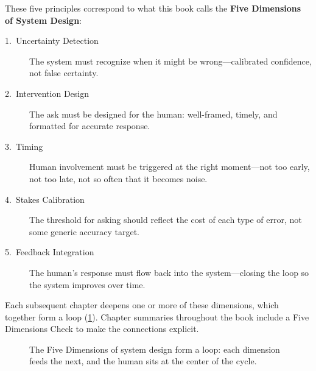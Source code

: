 These five principles correspond to what this book calls the \textbf{Five Dimensions of \hitl System Design}:

\begin{keyconcept}
\begin{description}
  \item[1.\ Uncertainty Detection] The system must recognize when it might be wrong---calibrated confidence, not false certainty.
  \item[2.\ Intervention Design] The ask must be designed for the human: well-framed, timely, and formatted for accurate response.
  \item[3.\ Timing] Human involvement must be triggered at the right moment---not too early, not too late, not so often that it becomes noise.
  \item[4.\ Stakes Calibration] The threshold for asking should reflect the cost of each type of error, not some generic accuracy target.
  \item[5.\ Feedback Integration] The human's response must flow back into the system---closing the loop so the system improves over time.
\end{description}
Each subsequent chapter deepens one or more of these dimensions, which together form a loop (\cref{fig:five-dimensions}). Chapter summaries throughout the book include a Five Dimensions Check to make the connections explicit.
\end{keyconcept}

\begin{figure}[htbp]
\centering
{}
\caption{The Five Dimensions of \hitl system design form a loop: each dimension feeds the next, and the human sits at the center of the cycle.}
\label{fig:five-dimensions}
\end{figure}

